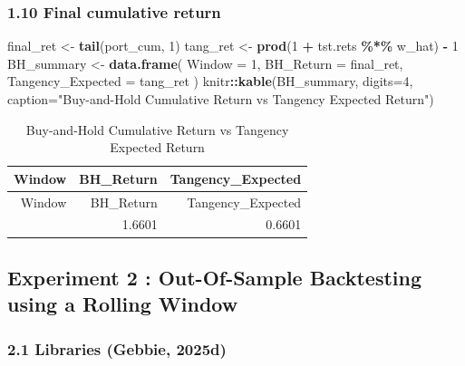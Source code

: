 \documentclass[
  12pt,
]{article}
\newenvironment{Shaded}{\begin{snugshade}}{\end{snugshade}}
\newcommand{\AttributeTok}[1]{\textcolor[rgb]{0.13,0.29,0.53}{#1}}
\newcommand{\DecValTok}[1]{\textcolor[rgb]{0.00,0.00,0.81}{#1}}
\newcommand{\FunctionTok}[1]{\textcolor[rgb]{0.13,0.29,0.53}{\textbf{#1}}}
\newcommand{\NormalTok}[1]{#1}
\newcommand{\OtherTok}[1]{\textcolor[rgb]{0.56,0.35,0.01}{#1}}
\newcommand{\SpecialCharTok}[1]{\textcolor[rgb]{0.81,0.36,0.00}{\textbf{#1}}}
\newcommand{\StringTok}[1]{\textcolor[rgb]{0.31,0.60,0.02}{#1}}
\begin{document}
\subsubsection{1.10 Final cumulative
return}\label{final-cumulative-return}

\begin{Shaded}
\begin{Highlighting}[]
\NormalTok{final\_ret }\OtherTok{\textless{}{-}} \FunctionTok{tail}\NormalTok{(port\_cum, }\DecValTok{1}\NormalTok{)}
\NormalTok{tang\_ret  }\OtherTok{\textless{}{-}} \FunctionTok{prod}\NormalTok{(}\DecValTok{1} \SpecialCharTok{+}\NormalTok{ tst.rets }\SpecialCharTok{\%*\%}\NormalTok{ w\_hat) }\SpecialCharTok{{-}} \DecValTok{1}
\NormalTok{BH\_summary }\OtherTok{\textless{}{-}} \FunctionTok{data.frame}\NormalTok{(}
  \AttributeTok{Window =} \DecValTok{1}\NormalTok{,}
  \AttributeTok{BH\_Return =}\NormalTok{ final\_ret,}
  \AttributeTok{Tangency\_Expected =}\NormalTok{ tang\_ret}
\NormalTok{)}
\NormalTok{knitr}\SpecialCharTok{::}\FunctionTok{kable}\NormalTok{(BH\_summary, }\AttributeTok{digits=}\DecValTok{4}\NormalTok{, }\AttributeTok{caption=}\StringTok{"Buy{-}and{-}Hold Cumulative Return vs Tangency Expected Return"}\NormalTok{)}
\end{Highlighting}
\end{Shaded}

\begin{longtable}[]{@{}rrr@{}}
\caption{Buy-and-Hold Cumulative Return vs Tangency Expected
Return}\tabularnewline
\toprule\noalign{}
Window & BH\_Return & Tangency\_Expected \\
\midrule\noalign{}
\endfirsthead
\toprule\noalign{}
Window & BH\_Return & Tangency\_Expected \\
\midrule\noalign{}
\endhead
\bottomrule\noalign{}
\endlastfoot
1 & 1.6601 & 0.6601 \\
\end{longtable}

\subsection{Experiment 2 : Out-Of-Sample Backtesting using a Rolling
Window}\label{experiment-2-out-of-sample-backtesting-using-a-rolling-window}

\subsubsection{2.1 Libraries (Gebbie,
2025d)}\label{libraries-tim_prep-1}
\end{document}
